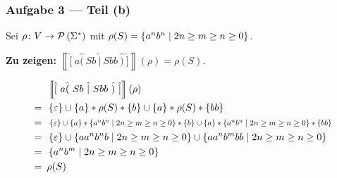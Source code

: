\documentclass{beamer}
\newcommand{\opt}[2]{\hat{(} \ #1 \ \hat{|} \ #2 \ \hat{)}}
\newcommand{\byp}[1]{\hat{[} \ #1 \ \hat{]}}
\newcommand{\sem}[1]{\left\llbracket #1 \right\rrbracket}
\begin{document}
\begin{frame} \frametitle{Aufgabe 3 --- Teil (b)}
	\small 
	Sei $\rho \colon V \to \mathcal{P}\left( \Sigma^\ast \right)$ mit $\rho(S) = \left\{ a^n b^n \mid 2n \ge m \ge n \ge 0 \right\}$. 
		
	\textbf{Zu zeigen:} $\sem{\byp{a \opt{Sb}{Sbb}}}(\rho) = \rho(S)$.
	
	\pause
	
	\begin{align*}
		&\sem{\byp{a \opt{Sb}{Sbb}}}(\rho) \\
		= \enskip & \menge{\epsilon} \cup \menge{a} * \rho(S) * \menge{b} \cup \menge{a} * \rho(S) * \menge{bb} \\
		= \enskip & \scalebox{0.8}{ $\menge{\epsilon} \cup \menge{a} * \menge{a^n b^n \mid 2n \ge m \ge n \ge 0} * \menge{b} \cup \menge{a} * \menge{a^n b^n \mid 2n \ge m \ge n \ge 0} * \menge{bb} $} \\
		= \enskip & \menge{\epsilon} \cup \menge{a a^n b^n b \mid 2n \ge m \ge n \ge 0} \cup \menge{a a^n b^m bb \mid 2n \ge m \ge n \ge 0}  \\
		= \enskip & \menge{a^n b^m \mid 2n \ge m \ge n \ge 0} \\
		= \enskip & \rho(S)
	\end{align*}
\end{frame}
\end{document}
